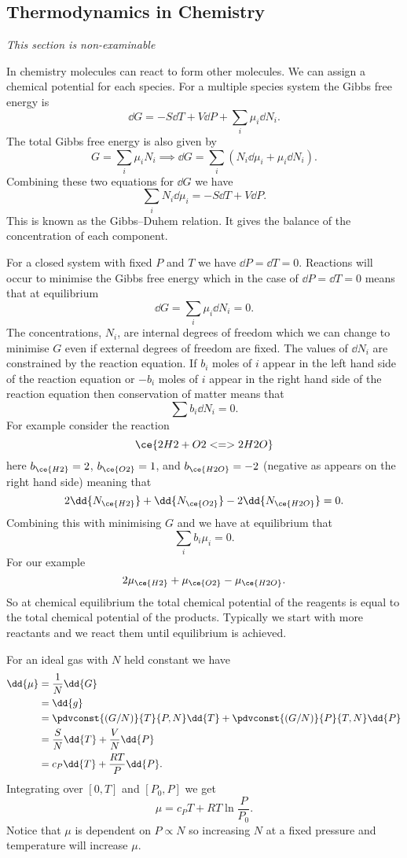     \subsection{Thermodynamics in Chemistry}
    \textit{This section is non-examinable}
    
    In chemistry molecules can react to form other molecules.
    We can assign a chemical potential for each species.
    For a multiple species system the Gibbs free energy is
    \[\dd{G} = -S\dd{T} + V\dd{P} + \sum_{i} \mu_i\dd{N_i}.\]
    The total Gibbs free energy is also given by
    \[G = \sum_{i} \mu_iN_i \implies \dd{G} = \sum_{i} (N_i\dd{\mu_i} + \mu_i\dd{N_i}).\]
    Combining these two equations for \(\dd{G}\) we have
    \[\sum_{i}N_i\dd{\mu_i} = -S\dd{T} + V\dd{P}.\]
    This is known as the Gibbs--Duhem relation.
    It gives the balance of the concentration of each component.
    
    For a closed system with fixed \(P\) and \(T\) we have \(\dd{P} = \dd{T} = 0\).
    Reactions will occur to minimise the Gibbs free energy which in the case of \(\dd{P} = \dd{T} = 0\) means that at equilibrium
    \[\dd{G} = \sum_{i} \mu_i\dd{N_i} = 0.\]
    The concentrations, \(N_i\), are internal degrees of freedom which we can change to minimise \(G\) even if external degrees of freedom are fixed.
    The values of \(\dd{N_i}\) are constrained by the reaction equation.
    If \(b_i\) moles of \(i\) appear in the left hand side of the reaction equation or \(-b_i\) moles of \(i\) appear in the right hand side of the reaction equation then conservation of matter means that
    \[\sum b_i\dd{N_i} = 0.\]
    For example consider the reaction
    \[\ce{2H2 + O2 <=> 2H2O}\]
    here \(b_{\ce{H2}} = 2\), \(b_{\ce{O2}} = 1\), and \(b_{\ce{H2O}} = -2\) (negative as  appears on the right hand side) meaning that
    \[2\dd{N_{\ce{H2}}} + \dd{N_{\ce{O2}}} - 2\dd{N_{\ce{H2O}}} = 0.\]
    Combining this with minimising \(G\) and we have at equilibrium that
    \[\sum_i b_i\mu_i = 0.\]
    For our example
    \[2\mu_{\ce{H2}} + \mu_{\ce{O2}} - \mu_{\ce{H2O}}.\]
    So at chemical equilibrium the total chemical potential of the reagents is equal to the total chemical potential of the products.
    Typically we start with more reactants and we react them until equilibrium is achieved.
    
    For an ideal gas with \(N\) held constant we have
    \begin{align*}
        \dd{\mu} &= \frac{1}{N}\dd{G}\\
        &= \dd{g}\\
        &= \pdvconst{(G/N)}{T}{P, N}\dd{T} + \pdvconst{(G/N)}{P}{T, N}\dd{P}\\
        &= \frac{S}{N}\dd{T} + \frac{V}{N}\dd{P}\\
        &= c_P\dd{T} + \frac{RT}{P}\dd{P}.
    \end{align*}
    Integrating over \([0, T]\) and \([P_0, P]\) we get
    \[\mu = c_PT + RT\ln\frac{P}{P_0}.\]
    Notice that \(\mu\) is dependent on \(P \propto N\) so increasing \(N\) at a fixed pressure and temperature will increase \(\mu\).
    
